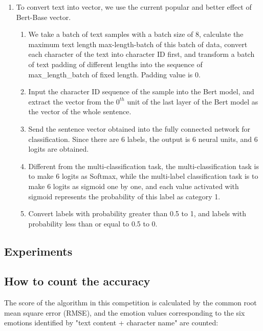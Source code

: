\documentclass[12pt,twocolumn,letterpaper]{article}
\begin{document}
\begin{enumerate}
\item To convert text into vector, we use the current popular and better effect of Bert-Base vector.

\begin{enumerate}
\item We take a batch of text samples with a batch size of 8, calculate the maximum text length max-length-batch of this batch of data, convert each character of the text into character ID first, and transform a batch of text padding of different lengths into the sequence of max\_length\_batch of fixed length. Padding value is 0. 

\item Input the character ID sequence of the sample into the Bert model, and extract the vector from the $0^{th}$ unit of the last layer of the Bert model as the vector of the whole sentence.  
\item Send the sentence vector obtained into the fully connected network for classification. Since there are 6 labels, the output is 6 neural units, and 6 logits are obtained. 

\item Different from the multi-classification task, the multi-classification task is to make 6 logits as Softmax, while the multi-label classification task is to make 6 logits as sigmoid one by one, and each value activated with sigmoid represents the probability of this label as category 1.

\item Convert labels with probability greater than 0.5 to 1, and labels with probability less than or equal to 0.5 to 0.  



\end{enumerate}

\end{enumerate}


\subsection{Experiments}


\subsection{How to count the accuracy}

The score of the algorithm in this competition is calculated by the common root mean square error (RMSE), and the emotion values corresponding to the six emotions identified by "text content + character name" are counted:\\
\end{document}

